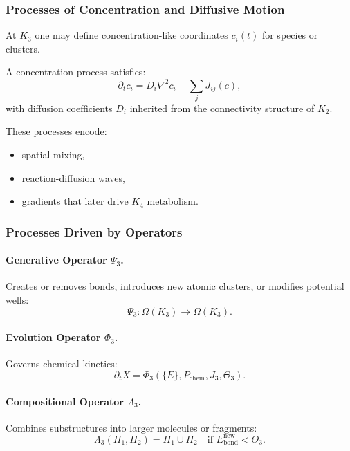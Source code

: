 \subsubsection{Processes of Concentration and Diffusive Motion}

At $K_3$ one may define concentration-like coordinates $c_i(t)$ for
species or clusters.

A concentration process satisfies:
\[
\partial_t c_i = D_i \nabla^2 c_i - \sum_j J_{ij}(c),
\]
with diffusion coefficients $D_i$ inherited from the connectivity
structure of $K_2$.

These processes encode:
\begin{itemize}
    \item spatial mixing,
    \item reaction-diffusion waves,
    \item gradients that later drive $K_4$ metabolism.
\end{itemize}

\subsubsection{Processes Driven by Operators}

\paragraph{Generative Operator \texorpdfstring{$\Psi_3$}{\Psi_3}.}
Creates or removes bonds, introduces new atomic clusters, or modifies
potential wells:
\[
\Psi_3 : \Omega(K_3) \to \Omega(K_3).
\]

\paragraph{Evolution Operator \texorpdfstring{$\Phi_3$}{\Phi_3}.}
Governs chemical kinetics:
\[
\partial_t X = \Phi_3(\{E\}, P_\text{chem}, J_3, \Theta_3).
\]

\paragraph{Compositional Operator \texorpdfstring{$\Lambda_3$}{\Lambda_3}.}
Combines substructures into larger molecules or fragments:
\[
\Lambda_3(H_1, H_2) = H_1 \cup H_2 \quad
\text{if } E_{\text{bond}}^{\text{new}} < \Theta_3.
\]


